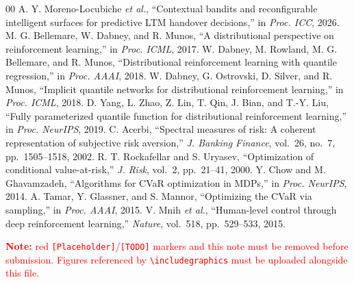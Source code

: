 \documentclass[conference]{IEEEtran}
\begin{document}
\begin{thebibliography}{00}
 A. Y. Moreno-Locubiche \emph{et al.}, ``Contextual bandits and reconfigurable intelligent surfaces for predictive LTM handover decisions,'' in \emph{Proc. ICC}, 2026.
 M. G. Bellemare, W. Dabney, and R. Munos, ``A distributional perspective on reinforcement learning,'' in \emph{Proc. ICML}, 2017.
 W. Dabney, M. Rowland, M. G. Bellemare, and R. Munos, ``Distributional reinforcement learning with quantile regression,'' in \emph{Proc. AAAI}, 2018.
 W. Dabney, G. Ostrovski, D. Silver, and R. Munos, ``Implicit quantile networks for distributional reinforcement learning,'' in \emph{Proc. ICML}, 2018.
 D. Yang, L. Zhao, Z. Lin, T. Qin, J. Bian, and T.-Y. Liu, ``Fully parameterized quantile function for distributional reinforcement learning,'' in \emph{Proc. NeurIPS}, 2019.
 C. Acerbi, ``Spectral measures of risk: A coherent representation of subjective risk aversion,'' \emph{J. Banking Finance}, vol.~26, no.~7, pp.~1505--1518, 2002.
 R. T. Rockafellar and S. Uryasev, ``Optimization of conditional value-at-risk,'' \emph{J. Risk}, vol.~2, pp.~21--41, 2000.
 Y. Chow and M. Ghavamzadeh, ``Algorithms for CVaR optimization in MDPs,'' in \emph{Proc. NeurIPS}, 2014.
 A. Tamar, Y. Glassner, and S. Mannor, ``Optimizing the CVaR via sampling,'' in \emph{Proc. AAAI}, 2015.
 V. Mnih \emph{et al.}, ``Human-level control through deep reinforcement learning,'' \emph{Nature}, vol.~518, pp.~529--533, 2015.
\end{thebibliography}

\vspace{6pt}
\textcolor{red}{\textbf{Note:} red \texttt{[Placeholder]}/\texttt{[TODO]} markers and this note must be removed before submission. Figures referenced by \texttt{\textbackslash includegraphics} must be uploaded alongside this file.}
\end{document}
